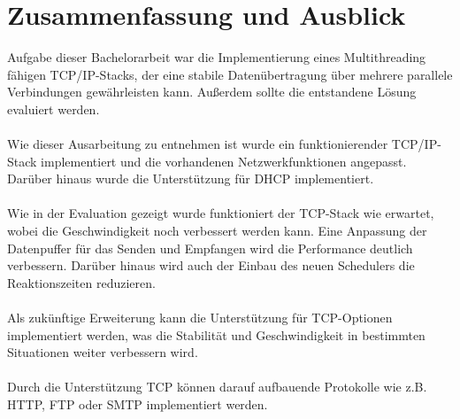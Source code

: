 \chapter{Zusammenfassung und Ausblick}

Aufgabe dieser Bachelorarbeit war die Implementierung eines Multithreading fähigen TCP/IP-Stacks, der eine stabile Datenübertragung über mehrere parallele Verbindungen gewährleisten kann. Außerdem sollte die entstandene Lösung evaluiert werden. \\\\
Wie dieser Ausarbeitung zu entnehmen ist wurde ein funktionierender TCP/IP-Stack implementiert und die vorhandenen Netzwerkfunktionen angepasst. Darüber hinaus wurde die Unterstützung für DHCP implementiert. \\\\
Wie in der Evaluation gezeigt wurde funktioniert der TCP-Stack wie erwartet, wobei die Geschwindigkeit noch verbessert werden kann. Eine Anpassung der Datenpuffer für das Senden und Empfangen wird die Performance deutlich verbessern. Darüber hinaus wird auch der Einbau des neuen Schedulers die Reaktionszeiten reduzieren. \\\\
Als zukünftige Erweiterung kann die Unterstützung für TCP-Optionen implementiert werden, was die Stabilität und Geschwindigkeit in bestimmten Situationen weiter verbessern wird.\\\\
Durch die Unterstützung TCP können darauf aufbauende Protokolle wie z.B. HTTP, FTP oder SMTP implementiert werden. 


